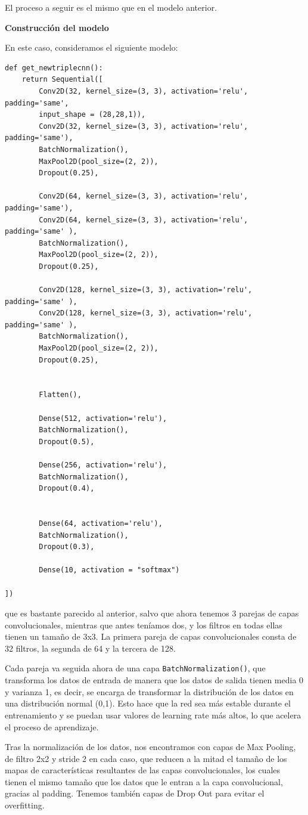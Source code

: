 \documentclass[a4paper,11pt]{article}
\begin{document}
El proceso a seguir es el mismo que en el modelo anterior.

\textbf{Construcción del modelo}

En este caso, consideramos el siguiente modelo:
\begin{verbatim}
def get_newtriplecnn():
	return Sequential([
		Conv2D(32, kernel_size=(3, 3), activation='relu', padding='same',
		input_shape = (28,28,1)),
		Conv2D(32, kernel_size=(3, 3), activation='relu', padding='same'),
		BatchNormalization(),
		MaxPool2D(pool_size=(2, 2)),
		Dropout(0.25),
		
		Conv2D(64, kernel_size=(3, 3), activation='relu', padding='same'),
		Conv2D(64, kernel_size=(3, 3), activation='relu', padding='same' ),
		BatchNormalization(),
		MaxPool2D(pool_size=(2, 2)),
		Dropout(0.25),
		
		Conv2D(128, kernel_size=(3, 3), activation='relu', padding='same' ),
		Conv2D(128, kernel_size=(3, 3), activation='relu', padding='same' ),
		BatchNormalization(),
		MaxPool2D(pool_size=(2, 2)),
		Dropout(0.25),
		
		
		Flatten(),
		
		Dense(512, activation='relu'),
		BatchNormalization(),
		Dropout(0.5),
		
		Dense(256, activation='relu'),
		BatchNormalization(),
		Dropout(0.4),
		
		
		Dense(64, activation='relu'),
		BatchNormalization(),
		Dropout(0.3),
		
		Dense(10, activation = "softmax")

])
\end{verbatim}

que es bastante parecido al anterior, salvo que ahora tenemos 3 parejas de capas convolucionales, mientras que antes teníamos dos, y los filtros en todas ellas tienen un tamaño de 3x3. La primera pareja de capas convolucionales consta de 32 filtros, la segunda de 64 y la tercera de 128. 

Cada pareja va seguida ahora de una capa \texttt{BatchNormalization()}, que transforma los datos de entrada de manera que los datos de salida tienen media 0 y varianza 1, es decir, se encarga de transformar la distribución de los datos en una distribución normal (0,1). Esto hace que la red sea más estable durante el entrenamiento y se puedan usar valores de learning rate más altos, lo que acelera el proceso de aprendizaje. 

Tras la normalización de los datos, nos encontramos con capas de Max Pooling, de filtro 2x2 y stride 2 en cada caso, que reducen a la mitad el tamaño de los mapas de características resultantes de las capas convolucionales, los cuales tienen el mismo tamaño que los datos que le entran a la capa convolucional, gracias al padding. Tenemos también capas de Drop Out para evitar el overfitting. 
\end{document}
